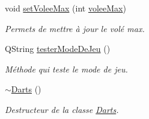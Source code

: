 \begin{DoxyCompactItemize}
void \hyperlink{class_darts_a982dda6ea65e4ada297cc562617fc3ba}{set\+Volee\+Max} (int \hyperlink{class_darts_aed9c6aa8f34fb2dcbc57a5ea24aa6c2a}{volee\+Max})
\begin{DoxyCompactList}\small\item\em Permets de mettre à jour le volé max. \end{DoxyCompactList}\item 
Q\+String \hyperlink{class_darts_ad6535ce917119069ec099cea0e744971}{tester\+Mode\+De\+Jeu} ()
\begin{DoxyCompactList}\small\item\em Méthode qui teste le mode de jeu. \end{DoxyCompactList}\item 
\hyperlink{class_darts_a335882c9fccd527d5c33a509269e0997}{$\sim$\+Darts} ()
\begin{DoxyCompactList}\small\item\em Destructeur de la classe \hyperlink{class_darts}{Darts}. \end{DoxyCompactList}\end{DoxyCompactItemize}
